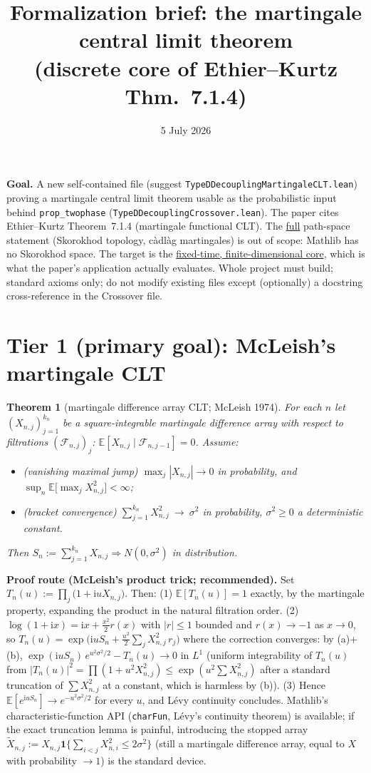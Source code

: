 \documentclass[11pt]{article}
\title{Formalization brief: the martingale central limit theorem\\
(discrete core of Ethier--Kurtz Thm.~7.1.4)}
\date{5 July 2026}
\theoremstyle{plain}
\newtheorem{theorem}{Theorem}
\theoremstyle{remark}
\newcommand{\E}{\mathbb{E}}\newcommand{\PP}{\mathbb{P}}
\newcommand{\To}{\Rightarrow}
\begin{document}
\maketitle

\noindent\textbf{Goal.} A new self-contained file (suggest
\texttt{TypeDDecouplingMartingaleCLT.lean}) proving a martingale central limit
theorem usable as the probabilistic input behind \texttt{prop\_twophase}
(\texttt{TypeDDecouplingCrossover.lean}). The paper cites Ethier--Kurtz
Theorem~7.1.4 (martingale functional CLT). The \underline{full} path-space statement
(Skorokhod topology, c\`adl\`ag martingales) is out of scope: Mathlib has no
Skorokhod space. The target is the \underline{fixed-time, finite-dimensional core},
which is what the paper's application actually evaluates. Whole project must
build; standard axioms only; do not modify existing files except (optionally) a
docstring cross-reference in the Crossover file.

\section*{Tier 1 (primary goal): McLeish's martingale CLT}

\begin{theorem}[martingale difference array CLT; McLeish 1974]\label{thm:mcleish}
For each $n$ let $(X_{n,j})_{j=1}^{k_n}$ be a square-integrable martingale
difference array with respect to filtrations
$(\mathcal F_{n,j})_j$: $\E[X_{n,j}\mid\mathcal F_{n,j-1}]=0$. Assume:
\begin{itemize}
\item[(a)] \textup{(vanishing maximal jump)}
  $\max_{j}|X_{n,j}|\to0$ in probability, and
  $\sup_n\E\big[\max_j X_{n,j}^2\big]<\infty$;
\item[(b)] \textup{(bracket convergence)}
  $\sum_{j=1}^{k_n}X_{n,j}^2\ \to\ \sigma^2$ in probability, $\sigma^2\ge0$
  a deterministic constant.
\end{itemize}
Then $S_n:=\sum_{j=1}^{k_n}X_{n,j}\To N(0,\sigma^2)$ in distribution.
\end{theorem}

\noindent\textbf{Proof route (McLeish's product trick; recommended).} Set
$T_n(u):=\prod_j\big(1+\mathrm iuX_{n,j}\big)$. Then:
(1) $\E[T_n(u)]=1$ exactly, by the martingale property, expanding the product
in the natural filtration order.
(2) $\log(1+\mathrm ix)=\mathrm ix+\tfrac{x^2}2 r(x)$ with $|r|\le1$ bounded and
$r(x)\to-1$ as $x\to0$, so
$T_n(u)=\exp\big(\mathrm iuS_n+\tfrac{u^2}2\sum_jX_{n,j}^2\,r_j\big)$ where the
correction converges: by (a)+(b),
$\exp(\mathrm iuS_n)\,e^{u^2\sigma^2/2}-T_n(u)\to0$ in $L^1$
(uniform integrability of $T_n(u)$ from
$|T_n(u)|^2=\prod(1+u^2X_{n,j}^2)\le\exp(u^2\sum X_{n,j}^2)$ after a standard
truncation of $\sum X_{n,j}^2$ at a constant, which is harmless by (b)).
(3) Hence $\E[e^{\mathrm iuS_n}]\to e^{-u^2\sigma^2/2}$ for every $u$, and
L\'evy continuity concludes. Mathlib's characteristic-function API
(\texttt{charFun}, L\'evy's continuity theorem) is available; if the exact
truncation lemma is painful, introducing the stopped array
$\tilde X_{n,j}:=X_{n,j}\mathbf 1\{\sum_{i<j}X_{n,i}^2\le2\sigma^2\}$ (still a
martingale difference array, equal to $X$ with probability $\to1$) is the
standard device.
\end{document}
